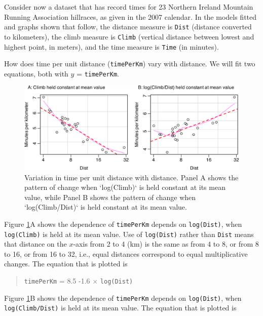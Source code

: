 \documentclass[
  10pt,
  b5paper]{book}
\begin{document}
Consider now a dataset that has record times for 23 Northern Ireland
Mountain Running Association hillraces, as given in the 2007
calendar. In the models fitted and graphs shown that follow,
the distance measure is \texttt{Dist} (distance converted to kilometers),
the climb measure is \texttt{Climb} (vertical distance between lowest
and highest point, in meters), and the time measure is \texttt{Time}
(in minutes).

How does time per unit distance (\texttt{timePerKm}) vary with distance.
We will fit two equations, both with \(y\) = \texttt{timePerKm}.

\begin{figure}[H]

{\centering \includegraphics[width=1\linewidth]{08-observational_files/figure-latex/partial-1} 

}

\caption{Variation in time per unit distance with distance.  Panel A
shows the pattern of change when `log(Climb)` is held constant at its 
mean value, while Panel B shows the pattern of change when 
`log(Climb/Dist)` is held constant at its mean value.}\label{fig:partial}
\end{figure}

Figure \ref{fig:partial}A shows the dependence of
\texttt{timePerKm} depends on \texttt{log(Dist)}, when \texttt{log(Climb)}
is held at its mean value. Use of \texttt{log(Dist)} rather than
\texttt{Dist} means that distance on the \(x\)-axis from 2 to 4 (km)
is the same as from 4 to 8, or from 8 to 16, or from 16 to 32,
i.e., equal distances correspond to equal multiplicative
changes. The equation that is plotted is

\begin{quote}
\texttt{timePerKm} = 8.5 -1.6 \(\times\) \texttt{log(Dist)}
\end{quote}

Figure \ref{fig:partial}B shows the dependence of
\texttt{timePerKm} depends on \texttt{log(Dist)}, when \texttt{log(Climb/Dist)}
is held at its mean value. The equation that is plotted is
\end{document}
